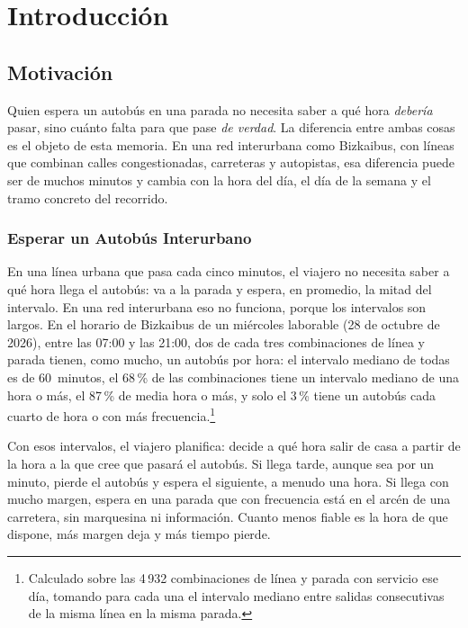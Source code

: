 \chapter{Introducción}
\label{cap:introduccion}

\section{Motivación}
\label{sec:motivacion}

Quien espera un autobús en una parada no necesita saber a qué hora \emph{debería} pasar, sino cuánto falta para que
pase \emph{de verdad}. La diferencia entre ambas cosas es el objeto de esta memoria. En una red interurbana como
Bizkaibus, con líneas que combinan calles congestionadas, carreteras y autopistas, esa diferencia puede ser de muchos
minutos y cambia con la hora del día, el día de la semana y el tramo concreto del recorrido.

\subsection{Esperar un Autobús Interurbano}
\label{sec:esperar}

En una línea urbana que pasa cada cinco minutos, el viajero no necesita saber a qué hora llega el autobús: va a la
parada y espera, en promedio, la mitad del intervalo. En una red interurbana eso no funciona, porque los intervalos son
largos. En el horario de Bizkaibus de un miércoles laborable (28 de octubre de 2026), entre las 07:00 y las 21:00, dos de
cada tres combinaciones de línea y parada tienen, como mucho, un autobús por hora: el intervalo mediano de todas es de
60~minutos, el 68\,\% de las combinaciones tiene un intervalo mediano de una hora o más, el 87\,\% de media hora o más,
y solo el 3\,\% tiene un autobús cada cuarto de hora o con más frecuencia.\footnote{Calculado sobre las 4\,932
combinaciones de línea y parada con servicio ese día, tomando para cada una el intervalo mediano entre salidas
consecutivas de la misma línea en la misma parada.}

Con esos intervalos, el viajero planifica: decide a qué hora salir de casa a partir de la hora a la que cree que
pasará el autobús. Si llega tarde, aunque sea por un minuto, pierde el autobús y espera el siguiente, a menudo una
hora. Si llega con mucho margen, espera en una parada que con frecuencia está en el arcén de una carretera, sin
marquesina ni información. Cuanto menos fiable es la hora de que dispone, más margen deja y más tiempo pierde.

